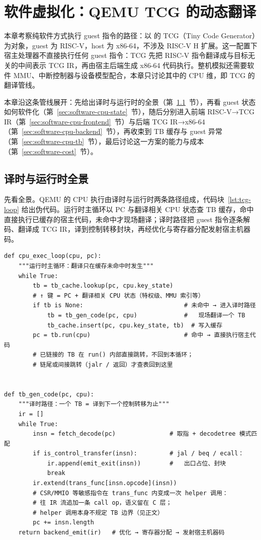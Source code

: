 \chapter{软件虚拟化：QEMU TCG 的动态翻译}\label{sec:software}

本章考察纯软件方式执行 guest 指令的路径：以  的 TCG（Tiny Code Generator）为对象，guest 为 RISC-V，host 为 x86-64，不涉及 RISC-V H 扩展\cite{source3}。这一配置下宿主处理器不直接执行任何 guest 指令：TCG 先把 RISC-V 指令翻译成与目标无关的中间表示 TCG IR，再由宿主后端生成 x86-64 代码执行。整机模拟还需要软件 MMU、中断控制器与设备模型配合，本章只讨论其中的 CPU 维，即 TCG 的翻译管线。

本章沿这条管线展开：先给出译时与运行时的全景（第~\ref{sec:software-cpu-loop}~节），再看 guest 状态如何软件化（第~\ref{sec:software-cpu-state}~节），随后分别进入前端 RISC-V→TCG IR（第~\ref{sec:software-cpu-frontend}~节）与后端 TCG IR→x86-64（第~\ref{sec:software-cpu-backend}~节），再收束到 TB 缓存与 guest 异常（第~\ref{sec:software-cpu-tb}~节），最后讨论这一方案的能力与成本（第~\ref{sec:software-cost}~节）。

\section{译时与运行时全景}\label{sec:software-cpu-loop}

先看全景。QEMU 的 CPU 执行由译时与运行时两条路径组成，代码块~\ref{lst:tcg-loop} 给出伪代码。运行时主循环以 PC 与翻译相关 CPU 状态查 TB 缓存，命中直接执行已缓存的宿主代码，未命中才现场翻译；译时路径把 guest 指令逐条解码、翻译成 TCG IR，译到控制转移封块，再经优化与寄存器分配发射宿主机器码。

\begin{lstlisting}[caption={QEMU 译时与运行时路径。译时把 guest 语义转换成宿主代码，运行时复用；依据源码与开发文档整理的机制示意，并非实测 trace。\cite{source3}},label={lst:tcg-loop},style=pseudopy]
def cpu_exec_loop(cpu, pc):
    """运行时主循环：翻译只在缓存未命中时发生"""
    while True:
        tb = tb_cache.lookup(pc, cpu.key_state)
        # ↑ 键 = PC + 翻译相关 CPU 状态（特权级、MMU 索引等）
        if tb is None:                            # 未命中 → 进入译时路径
            tb = tb_gen_code(pc, cpu)             #   现场翻译一个 TB
            tb_cache.insert(pc, cpu.key_state, tb)  # 写入缓存
        pc = tb.run(cpu)                          # 命中 → 直接执行宿主代码
        # 已链接的 TB 在 run() 内部直接跳转，不回到本循环；
        # 链尾或间接跳转（jalr / 返回）才查表回到这里


def tb_gen_code(pc, cpu):
    """译时路径：一个 TB = 译到下一个控制转移为止"""
    ir = []
    while True:
        insn = fetch_decode(pc)               # 取指 + decodetree 模式匹配
        if is_control_transfer(insn):         # jal / beq / ecall：
            ir.append(emit_exit(insn))        #   出口占位、封块
            break
        ir.extend(trans_func[insn.opcode](insn))
        # CSR/MMIO 等敏感指令在 trans_func 内变成一次 helper 调用：
        # 往 IR 流追加一条 call op，语义留在 C 层；
        # helper 调用本身不规定 TB 边界（见正文）
        pc += insn.length
    return backend_emit(ir)   # 优化 → 寄存器分配 → 发射宿主机器码
\end{lstlisting}

